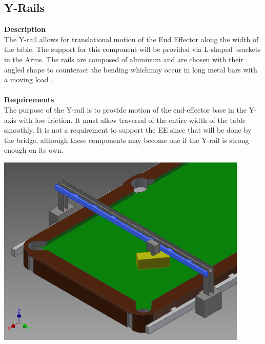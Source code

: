 \documentclass[titlepage]{article}
\begin{document}
\begin{center}
\begin{center}
\begin{center}
\begin{center}
\begin{center}
\begin{center}
\begin{center}
\subsection{Y-Rails}
\textbf{Description}\\
The Y-rail allows for translational motion of the End Effector along the width of the table. The support for this component will be provided via L-shaped brackets in the Arms. The rails are composed of aluminum and are chosen with their angled shape to counteract the bending whichmay occur in long metal bars with a moving load .\\\\
\textbf{Requirements}\\
The purpose of the Y-rail is to provide motion of the end-effector base in the Y-axis with low friction. It must allow traversal of the entire width of the table smoothly. It is not a requirement to support the EE since that will be done by the bridge, although these components may become one if the Y-rail is strong enough on its own.
\begin{center}
	\includegraphics[width = 0.9\textwidth]{yRail1.png} 		%
\label{fig:yRailFig}
\end{center}



\end{center}
\end{center}
\end{center}
\end{center}
\end{center}
\end{center}
\end{center}
\end{document}
